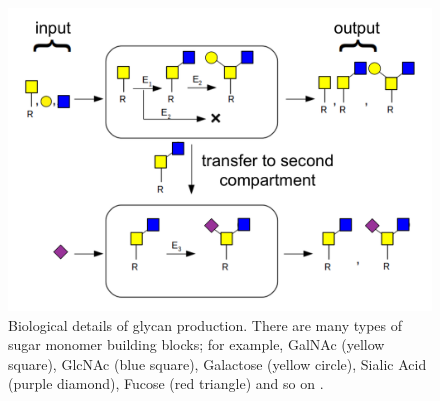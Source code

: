 %


\begin{figure}[t]
  \centering
  \begin{minipage}{0.54\linewidth}
    \includegraphics[width=0.9\linewidth]{gfig1.png}    
  \end{minipage}
  \begin{minipage}{0.44\linewidth}
    \caption{Biological details of glycan production. There are many types of sugar monomer building blocks; %
      for example, GalNAc (yellow square), GlcNAc (blue square), Galactose (yellow circle), Sialic Acid (purple diamond), Fucose (red triangle) and so on \cite{Varki2017}.}
    \label{fig:glycan-rule}
  \end{minipage}
\end{figure}


